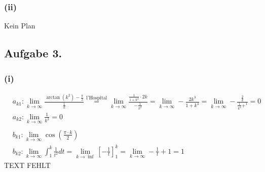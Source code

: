 \documentclass[10pt,a4paper]{article}
\begin{document}
\subsubsection*{\textbf{(ii)}}
Kein Plan
\subsection*{Aufgabe 3.}
\subsubsection*{\textbf{(i)}}
\begin{align*}
&a_{k1}: \lim_{k \to \infty} \frac{ \arctan \left( k^2 \right) - \frac{\pi}2}{\frac 1k} \overset{\text{l'Hospital}}{=} \lim_{k \to \infty} \frac{\frac{1}{1+ k^4} \cdot 2k}{- \frac{1}{k^2}} = \lim_{k \to \infty} - \frac{2k^3}{1+k^4} = \lim_{k \to \infty} - \frac{\frac 2k}{\frac 1{k^4} + ^1} = 0\\
&a_{k2}: \lim_{k \to \infty} \frac 1{k^3} = 0\\
\\
&b_{k1}: \lim_{k \to \infty} \cos \left( \frac{\pi \cdot k}{2} \right)\\
&b_{k2}: \lim_{k \to \infty} \int_1^k \frac 1{t^2} dt = \lim_{k \to \inf} \left[ - \frac 1t \right]_1^k = \lim_{k \to \infty} -\frac 1t + 1 = 1 
\end{align*}
TEXT FEHLT
\end{document}

